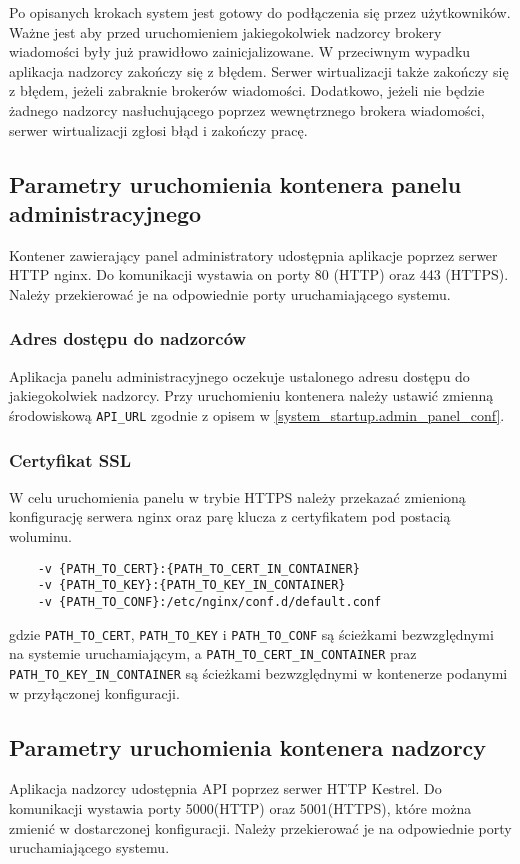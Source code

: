 \documentclass[../opis-rozwiazania.tex]{subfiles}
\begin{document}
Po opisanych krokach system jest gotowy do podłączenia się przez użytkowników.
Ważne jest aby przed uruchomieniem jakiegokolwiek nadzorcy brokery wiadomości były już prawidłowo zainicjalizowane.
W przeciwnym wypadku aplikacja nadzorcy zakończy się z błędem.
Serwer wirtualizacji także zakończy się z błędem, jeżeli zabraknie brokerów wiadomości.
Dodatkowo, jeżeli nie będzie żadnego nadzorcy nasłuchującego poprzez wewnętrznego brokera wiadomości, serwer wirtualizacji zgłosi błąd i zakończy pracę.

\subsection{Parametry uruchomienia kontenera panelu administracyjnego}
Kontener zawierający panel administratory udostępnia aplikacje poprzez serwer HTTP nginx.
Do komunikacji wystawia on porty 80 (HTTP) oraz 443 (HTTPS).
Należy przekierować je na odpowiednie porty uruchamiającego systemu.

\subsubsection{Adres dostępu do nadzorców}
Aplikacja panelu administracyjnego oczekuje ustalonego adresu dostępu do jakiegokolwiek nadzorcy.
Przy uruchomieniu kontenera należy ustawić zmienną środowiskową \texttt{API\_URL} zgodnie z opisem w \ref{system_startup.admin_panel_conf}.

\subsubsection{Certyfikat SSL}
W celu uruchomienia panelu w trybie HTTPS należy przekazać zmienioną konfigurację serwera nginx oraz parę klucza z certyfikatem pod postacią woluminu.
\begin{verbatim}
	-v {PATH_TO_CERT}:{PATH_TO_CERT_IN_CONTAINER}
	-v {PATH_TO_KEY}:{PATH_TO_KEY_IN_CONTAINER}
	-v {PATH_TO_CONF}:/etc/nginx/conf.d/default.conf
\end{verbatim}
gdzie \texttt{PATH\_TO\_CERT}, \texttt{PATH\_TO\_KEY} i \texttt{PATH\_TO\_CONF} są ścieżkami bezwzględnymi na systemie uruchamiającym, a \texttt{PATH\_TO\_CERT\_IN\_CONTAINER} praz \texttt{PATH\_TO\_KEY\_IN\_CONTAINER} są ścieżkami bezwzględnymi w kontenerze podanymi w przyłączonej konfiguracji.

\subsection{Parametry uruchomienia kontenera nadzorcy}
Aplikacja nadzorcy udostępnia API poprzez serwer HTTP Kestrel.
Do komunikacji wystawia porty 5000(HTTP) oraz 5001(HTTPS), które można zmienić w dostarczonej konfiguracji.
Należy przekierować je na odpowiednie porty uruchamiającego systemu.
\end{document}

